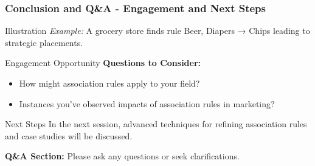 \documentclass[aspectratio=169]{beamer}
\begin{document}
\begin{frame}[fragile]
    \frametitle{Conclusion and Q\&A - Engagement and Next Steps}
    \begin{block}{Illustration}
        \textit{Example:} A grocery store finds rule {Beer, Diapers} → {Chips} leading to strategic placements.
    \end{block}
    
    \begin{block}{Engagement Opportunity}
        \textbf{Questions to Consider:}
        \begin{itemize}
            \item How might association rules apply to your field?
            \item Instances you've observed impacts of association rules in marketing?
        \end{itemize}
    \end{block}

    \begin{block}{Next Steps}
        In the next session, advanced techniques for refining association rules and case studies will be discussed.
    \end{block}

    \textbf{Q\&A Section:} Please ask any questions or seek clarifications.
\end{frame}
\end{document}
